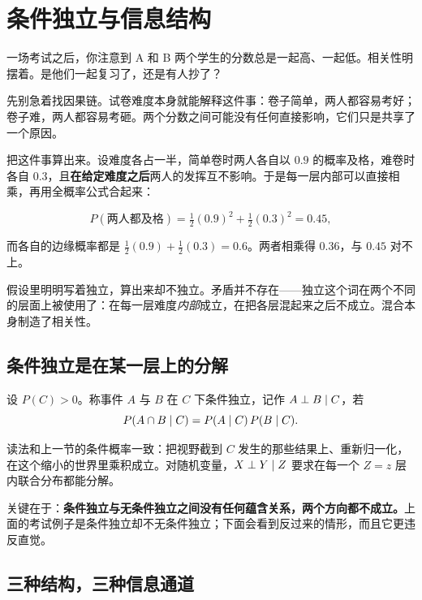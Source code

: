 \section{条件独立与信息结构}
\label{sec:05-Probability/02-Conditional-Probability/04}

一场考试之后，你注意到 A 和 B 两个学生的分数总是一起高、一起低。相关性明摆着。是他们一起复习了，还是有人抄了？

先别急着找因果链。试卷难度本身就能解释这件事：卷子简单，两人都容易考好；卷子难，两人都容易考砸。两个分数之间可能没有任何直接影响，它们只是共享了一个原因。

把这件事算出来。设难度各占一半，简单卷时两人各自以 \(0.9\) 的概率及格，难卷时各自 \(0.3\)，且\textbf{在给定难度之后}两人的发挥互不影响。于是每一层内部可以直接相乘，再用全概率公式合起来：

\[
P(\text{两人都及格})=\tfrac12(0.9)^2+\tfrac12(0.3)^2=0.45,
\]

而各自的边缘概率都是 \(\tfrac12(0.9)+\tfrac12(0.3)=0.6\)。两者相乘得 \(0.36\)，与 \(0.45\) 对不上。

假设里明明写着独立，算出来却不独立。矛盾并不存在——独立这个词在两个不同的层面上被使用了：在每一层难度\emph{内部}成立，在把各层混起来之后不成立。混合本身制造了相关性。

\subsection{条件独立是在某一层上的分解}

\begin{definition}
设 \(P(C)>0\)。称事件 \(A\) 与 \(B\) 在 \(C\) 下条件独立，记作 \(A\perp B\mid C\)，若
\[
P(A\cap B\mid C)=P(A\mid C)\,P(B\mid C).
\]
\end{definition}

读法和上一节的条件概率一致：把视野截到 \(C\) 发生的那些结果上、重新归一化，在这个缩小的世界里乘积成立。对随机变量，\(X\perp Y\mid Z\) 要求在每一个 \(Z=z\) 层内联合分布都能分解。

关键在于：\textbf{条件独立与无条件独立之间没有任何蕴含关系，两个方向都不成立。}上面的考试例子是条件独立却不无条件独立；下面会看到反过来的情形，而且它更违反直觉。

\subsection{三种结构，三种信息通道}

